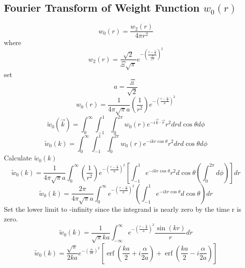 \documentclass[letterpaper,twocolumn,amsmath,amssymb,prb]{revtex4-1}
\begin{document}
\begin{widetext}
\subsection{Fourier Transform of Weight Function $w_0(r)$}
\begin{equation}{w_0(r)=\frac{w_2(r)}{4{\pi}r^2}}\end{equation}
where
\begin{equation}{w_2(r)=\frac{\sqrt{2}}{\Xi\sqrt{\pi}}e^{-\left(\frac{r-\frac{\alpha}{2}}{\frac{\Xi}{\sqrt{2}}}\right)^2}}\end{equation}
set 
\begin{equation}{a=\frac{\Xi}{\sqrt{2}}}\end{equation}
\begin{equation}{w_0(r)=\frac{1}{4{\pi}\sqrt{\pi}a}\left(\frac{1}{r^2}\right)e^{-\left(\frac{r-\frac{\alpha}{2}}{a}\right)^2}}\end{equation}
\begin{equation}{\widetilde{w}_0(\vec{k})=\int_{0}^{\infty}\int_{-1}^{1}\int_{0}^{2\pi}w_0(r)e^{-i\vec{k}\cdot{\vec{r}}}r^2d{r}d{\cos\theta}d{\phi}}\end{equation}
\begin{equation}{\widetilde{w}_0(k)=\int_{0}^{\infty}\int_{-1}^{1}\int_{0}^{2\pi}w_0(r)e^{-ikr\cos\theta}r^2d{r}d{\cos\theta}d{\phi}}\end{equation}
\[{}\]
Calculate $\widetilde{w}_0(k)$ 
\begin{equation}{\widetilde{w}_0(k)=\frac{1}{4{\pi}\sqrt{\pi}a}\int_{0}^{\infty}\left(\frac{1}{r^2}\right)e^{-\left(\frac{r-\frac{\alpha}{2}}{a}\right)^2}\left[\int_{-1}^{1}e^{-ikr\cos\theta}r^2d{\cos\theta}\left(\int_{0}^{2\pi}d{\phi}\right)\right]d{r}}\end{equation}
\[{}\]
\begin{equation}{\widetilde{w}_0(k)=\frac{2\pi}{4{\pi}\sqrt{\pi}a}\int_{0}^{\infty}e^{-\left(\frac{r-\frac{\alpha}{2}}{a}\right)^2}\left(\int_{-1}^{1}e^{-ikr\cos\theta}d{\cos\theta}\right)d{r}}\end{equation}
\[{}\]
Set the lower limit to -infinity since the integrand is nearly zero by the time r is zero. 
\begin{displaymath}{\widetilde{w}_0(k)=\frac{1}{\sqrt{\pi}ka}\int_{-\infty}^{\infty}e^{-\left(\frac{r-\frac{\alpha}{2}}{a}\right)^2}\frac{\sin(kr)}{r}d{r}}\end{displaymath}
\[{}\]
\begin{equation}{\widetilde{w}_0(k)=\frac{\sqrt{\pi}}{2ka}e^{-\left(\frac{\alpha}{2a}\right)^2}\left[\operatorname{erf}\left(\frac{ka}{2}+i\frac{\alpha}{2a}\right)+\operatorname{erf}\left(\frac{ka}{2}-i\frac{\alpha}{2a}\right)\right]}\end{equation}

\end{widetext}
\end{document}
